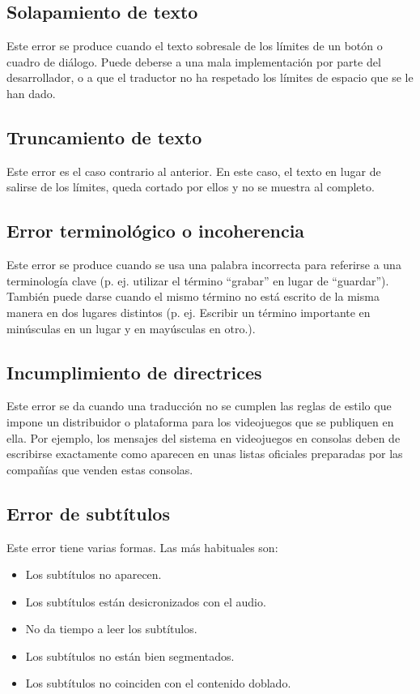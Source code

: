 \subsection{Solapamiento de texto}\label{ErrorSolapamiento}
Este error se produce cuando el texto sobresale de los límites de un botón o cuadro de diálogo. Puede deberse a una mala implementación por parte del desarrollador, o a que el traductor no ha respetado los límites de espacio que se le han dado.

\subsection{Truncamiento de texto}\label{ErrorTruncamiento}
Este error es el caso contrario al anterior. En este caso, el texto en lugar de salirse de los límites, queda cortado por ellos y no se muestra al completo.

\subsection{Error terminológico o incoherencia}\label{ErrorTermino}
Este error se produce cuando se usa una palabra incorrecta para referirse a una terminología clave (p. ej. utilizar el término ``grabar'' en lugar de ``guardar''). También puede darse cuando el mismo término no está escrito de la misma manera en dos lugares distintos (p. ej. Escribir un término importante en minúsculas en un lugar y en mayúsculas en otro.).

\subsection{Incumplimiento de directrices}\label{ErrorDirectrices}
Este error se da cuando una traducción no se cumplen las reglas de estilo que impone un distribuidor o plataforma para los videojuegos que se publiquen en ella. Por ejemplo, los mensajes del sistema en videojuegos en consolas deben de escribirse exactamente como aparecen en unas listas oficiales preparadas por las compañías que venden estas consolas.

\subsection{Error de subtítulos}\label{ErrorSubtitulos}
Este error tiene varias formas. Las más habituales son:
\begin{itemize}
	\item Los subtítulos no aparecen.
	\item Los subtítulos están desicronizados con el audio.
	\item No da tiempo a leer los subtítulos.
	\item Los subtítulos no están bien segmentados.
	\item Los subtítulos no coinciden con el contenido doblado. 
\end{itemize}


